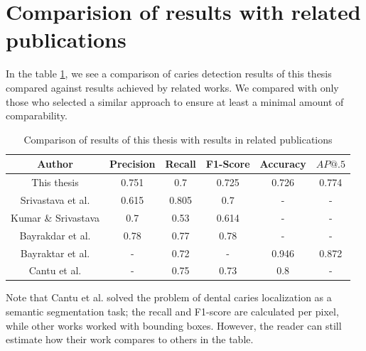 \section{Comparision of results with related publications}
\label{sec:result_comparision_with_lit}
In the table \ref{tab:results_comparison}, we see a comparison of caries detection results of this thesis compared against results achieved by related works. We compared with only those who selected a similar approach to ensure at least a minimal amount of comparability.

\begin{table}
    \centering
    \begin{tabular}{|c|c|c|c|c|c|}
        \hline
        Author                                                                 & Precision & Recall & F1-Score & Accuracy & $AP@.5$ \\ \hline
        This thesis                                                            & 0.751     & 0.7    & 0.725    & 0.726    & 0.774   \\ \hline
        Srivastava et al. \cite{Srivastava2017}                                & 0.615     & 0.805  & 0.7      & -        & -       \\ \hline
        Kumar                                   \& Srivastava \cite{Kumar2018} & 0.7       & 0.53   & 0.614    & -        & -       \\ \hline
        Bayrakdar et al. \cite{Bayrakdar2021}                                  & 0.78      & 0.77   & 0.78     & -        & -       \\ \hline
        Bayraktar et al. \cite{Bayraktar2021}                                  & -         & 0.72   & -        & 0.946    & 0.872   \\ \hline
        Cantu et al. \cite{Cantu2020}                                          & -         & 0.75   & 0.73     & 0.8      & -       \\ \hline
    \end{tabular}
    \caption{Comparison of results of this thesis with results in related publications}
    \label{tab:results_comparison}
\end{table}

Note that Cantu et al. \cite{Cantu2020} solved the problem of dental caries localization as a semantic segmentation task; the recall and F1-score are calculated per pixel, while other works worked with bounding boxes. However, the reader can still estimate how their work compares to others in the table.



